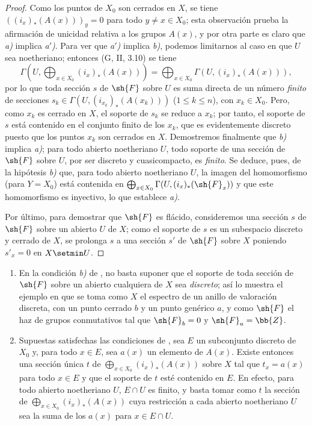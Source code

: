 \begin{proof}
Como los puntos de $X_0$ son cerrados en $X$, se tiene $((i_x)_*(A(x)))_y=0$ para todo $y\neq x\in X_0$;
esta observación prueba la afirmación de unicidad relativa a los grupos $A(x)$, y por otra parte es claro que \emph{a)} implica \emph{a$'$)}.
Para ver que \emph{a$'$)} implica \emph{b)}, podemos limitarnos al caso en que $U$ sea noetheriano;
entonces (G, II, 3.10) se tiene
\[
  \Gamma(U,\bigoplus_{x\in X_0}(i_x)_*(A(x)))
  =\bigoplus_{x\in X_0}\Gamma(U,(i_x)_*(A(x))),
\]
por lo que toda sección $s$ de $\sh{F}$ sobre $U$ es suma directa de un número \emph{finito} de secciones $s_k\in\Gamma(U,(i_{x_k})_*(A(x_k)))$ ($1\leq k\leq n$), con $x_k\in X_0$.
Pero, como $x_k$ es cerrado en $X$, el soporte de $s_k$ se reduce a $x_k$; por tanto, el soporte de $s$ está contenido en el conjunto finito de los $x_k$, que es evidentemente discreto puesto que los puntos $x_k$ son cerrados en $X$.
Demostremos finalmente que \emph{b)} implica \emph{a)};
para todo abierto noetheriano $U$, todo soporte de una sección de $\sh{F}$ sobre $U$, por ser discreto y cuasicompacto, es \emph{finito}.
Se deduce, pues, de la hipótesis \emph{b)} que, para todo abierto noetheriano $U$, la imagen del homomorfismo  (para $Y=X_0$) está contenida en $\bigoplus_{x\in X_0}\Gamma(U,(i_x)_*(\sh{F}_x))$ y que este homomorfismo es inyectivo, lo que establece \emph{a)}.

Por último, para demostrar que $\sh{F}$ es flácido, consideremos una sección $s$ de $\sh{F}$ sobre un abierto $U$ de $X$;
como el soporte de $s$ es un subespacio discreto y cerrado de $X$, se prolonga $s$ a una sección $s'$ de $\sh{F}$ sobre $X$ poniendo $s'_x=0$ en $X\setmin U$.
\end{proof}

\begin{remark}[21.9.3]
\label{IV.21.9.3}
\begin{enumerate}[label=(\roman*)]
  \item En la condición \emph{b)} de , no basta suponer que el soporte de toda sección de $\sh{F}$ sobre un abierto cualquiera de $X$ sea \emph{discreto};
así lo muestra el ejemplo en que se toma como $X$ el espectro de un anillo de valoración discreta, con un punto cerrado $b$ y un punto genérico $a$, y como $\sh{F}$ el haz de grupos conmutativos tal que $\sh{F}_b=0$ y $\sh{F}_a=\bb{Z}$.

  \item Supuestas satisfechas las condiciones de , sea $E$ un subconjunto discreto de $X_0$ y, para todo $x\in E$, sea $a(x)$ un elemento de $A(x)$.
Existe entonces una sección única $t$ de $\bigoplus_{x\in X_0}(i_x)_*(A(x))$ sobre $X$ tal que $t_x=a(x)$ para todo $x\in E$ y que el soporte de $t$ esté contenido en $E$.
En efecto, para todo abierto noetheriano $U$, $E\cap U$ es finito, y basta tomar como $t$ la sección de $\bigoplus_{x\in X_0}(i_x)_*(A(x))$ cuya restricción a cada abierto noetheriano $U$ sea la suma de los $a(x)$ para $x\in E\cap U$.
\end{enumerate}
\end{remark}

